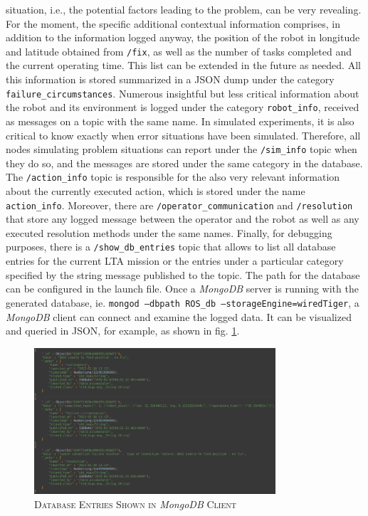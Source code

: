 \documentclass[english, master, utf8]{base/thesis_KBS}
\newcommand{\code}[1]{\colorbox{light-gray}{\texttt{#1}}}
\begin{document}
situation, i.e., the potential factors leading to the problem, can be very revealing. For the moment, the specific additional contextual information comprises, in addition to the
information logged anyway, the position of the robot in longitude and latitude obtained from \code{/fix}, as well as the number of tasks completed and the current operating time. This
list can be extended in the future as needed. All this information is stored summarized in a JSON dump under the category \code{failure\_circumstances}. Numerous insightful but less
critical information about the robot and its environment is logged under the category \code{robot\_info}, received as messages on a topic with the same name. In simulated experiments,
it is also critical to know exactly when error situations have been simulated. Therefore, all nodes simulating problem situations can report under the \code{/sim\_info} topic when they
do so, and the messages are stored under the same category in the database. The \code{/action\_info} topic is responsible for the also very relevant information about the currently
executed action, which is stored under the name \code{action\_info}. Moreover, there are \code{/operator\_communication} and \code{/resolution} that store any logged message between
the operator and the robot as well as any executed resolution methods under the same names. Finally, for debugging purposes, there is a \code{/show\_db\_entries} topic that allows to list
all database entries for the current LTA mission or the entries under a particular category specified by the string message published to the topic. The path for the
database can be configured in the launch file. Once a \textit{MongoDB} server is running with the generated database, ie. \code{mongod --dbpath ROS\_db --storageEngine=wiredTiger},
a \textit{MongoDB} client can connect and examine the logged data. It can be visualized and queried in JSON, for example, as shown in fig. \ref{fig:database_entries}.
\begin{figure}[H]
    \centering
    \includegraphics[width=0.8\textwidth]{pics/database_entries.png}
    \caption{\textsc{Database Entries Shown in} \textit{MongoDB} \textsc{Client}}
    \label{fig:database_entries}
\end{figure}
\end{document}
